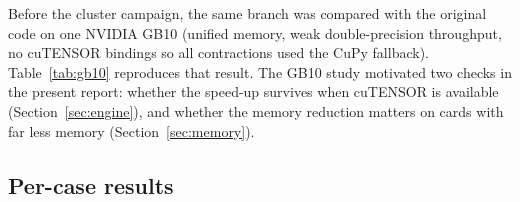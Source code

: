 Before the cluster campaign, the same branch was compared with the original code on one NVIDIA GB10 (unified memory, weak double-precision throughput, no cuTENSOR bindings so all contractions used the CuPy fallback). Table~\ref{tab:gb10} reproduces that result. The GB10 study motivated two checks in the present report: whether the speed-up survives when cuTENSOR is available (Section~\ref{sec:engine}), and whether the memory reduction matters on cards with far less memory (Section~\ref{sec:memory}).



\begin{landscape}
\section{Per-case results}

\end{landscape}
